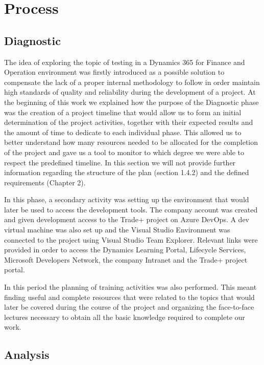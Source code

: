\chapter{Process}

\section{Diagnostic} 

The idea of exploring the topic of testing in a Dynamics 365 for Finance and Operation environment was firstly introduced as a possible solution to compensate the lack of a proper internal methodology to follow in order maintain high standards of quality and reliability during the development of a project. 
At the beginning of this work we explained how the purpose of the Diagnostic phase was the creation of a project timeline that would allow us to form an initial determination of the project activities, together with their expected results and the amount of time to dedicate to each individual phase. This allowed us to better understand how many resources needed to be allocated for the completion of the project and gave us a tool to monitor to which degree we were able to respect the predefined timeline. In this section we will not provide further information regarding the structure of the plan (section 1.4.2) and the defined requirements (Chapter 2).

In this phase, a secondary activity was setting up the environment that would later be used to access the development tools. The company account was created and given development access to the Trade+ project on Azure DevOps. A dev virtual machine was also set up and the Visual Studio Environment was connected to the project using Visual Studio Team Explorer. Relevant links were provided in order to access the Dynamics Learning Portal, Lifecycle Services, Microsoft Developers Network, the company Intranet and the Trade+ project portal.

In this period the planning of training activities was also performed. This meant finding useful and complete resources that were related to the topics that would later be covered during the course of the project and organizing the face-to-face lectures necessary to obtain all the basic knowledge required to complete our work.

\section{Analysis} 

